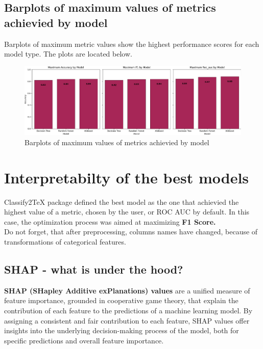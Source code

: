 \documentclass{article}%
\begin{document}
%
\subsection{Barplots of maximum values of metrics achievied by model}%
\label{subsec:Barplotsofmaximumvaluesofmetricsachieviedbymodel}%
Barplots of maximum metric values show the highest performance scores for each model type. The plots are located below.%


\begin{figure}[h!]%
\centering%
\includegraphics[width=460px]{ModelOptimization/barplots_max_metric.png}%
\caption{Barplots of maximum values of metrics achievied by model}%
\end{figure}

%
\newpage%
\section{Interpretabilty of the best models}%
\label{sec:Interpretabiltyofthebestmodels}%
Classify2TeX package defined the best model as the one that achievied the highest value of a metric, chosen by the user, or ROC AUC by default.%
In this case, the optimization process was aimed at maximizing%
\textbf{ F1 Score.}%
\\%
Do not forget, that after preprocessing, columns names have changed, because of transformations of categorical features.%
\subsection{SHAP {-} what is under the hood?}%
\label{subsec:SHAP{-}whatisunderthehood?}%

        \textbf{SHAP (SHapley Additive exPlanations) values} are a unified measure of feature importance, grounded in cooperative game theory, that explain the contribution of each feature to the predictions of a machine learning model. By assigning a consistent and fair contribution to each feature, SHAP values offer insights into the underlying decision-making process of the model, both for specific predictions and overall feature importance.
\end{document}
